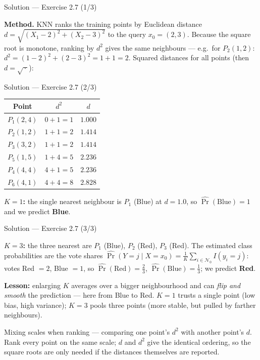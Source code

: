 \documentclass[aspectratio=169,11pt]{beamer}
\begin{document}
\begin{frame}{Solution --- Exercise 2.7 (1/3)}
\begin{solutionbox}
\textbf{Method.} KNN ranks the training points by Euclidean distance
$d=\sqrt{(X_1-2)^2+(X_2-3)^2}$ to the query $x_0=(2,3)$. Because the
square root is monotone, ranking by $d^2$ gives the same neighbours ---
e.g.\ for $P_2(1,2)$: $d^2=(1-2)^2+(2-3)^2=1+1=2$. Squared distances
for all points (then $d=\sqrt{\,\cdot\,}$):
\end{solutionbox}
\end{frame}

\begin{frame}{Solution --- Exercise 2.7 (2/3)}
\begin{solutionbox}
\begin{center}\footnotesize
\begin{tabular}{ccc}
\toprule
Point & $d^2$ & $d$ \\
\midrule
$P_1(2,4)$ & $0+1=1$ & $1.000$ \\
$P_2(1,2)$ & $1+1=2$ & $1.414$ \\
$P_3(3,2)$ & $1+1=2$ & $1.414$ \\
$P_5(1,5)$ & $1+4=5$ & $2.236$ \\
$P_4(4,4)$ & $4+1=5$ & $2.236$ \\
$P_6(4,1)$ & $4+4=8$ & $2.828$ \\
\bottomrule
\end{tabular}
\end{center}
\textbf{$K=1$:} the single nearest neighbour is $P_1$ (Blue) at
$d=1.0$, so $\hat\Pr(\text{Blue})=1$ and we predict \textbf{Blue}.
\end{solutionbox}
\end{frame}

\begin{frame}{Solution --- Exercise 2.7 (3/3)}
\begin{solutionbox}
\textbf{$K=3$:} the three nearest are $P_1$ (Blue), $P_2$ (Red),
$P_3$ (Red). The estimated class probabilities are the vote shares
$\hat\Pr(Y=j\mid X=x_0)=\frac1K\sum_{i\in\mathcal N_0}I(y_i=j)$:
votes Red $=2$, Blue $=1$, so
$\hat\Pr(\text{Red})=\tfrac23$, $\hat\Pr(\text{Blue})=\tfrac13$; we
predict \textbf{Red}.

\textbf{Lesson:} enlarging $K$ averages over a bigger neighbourhood
and can \emph{flip and smooth} the prediction --- here from Blue to
Red. $K=1$ trusts a single point (low bias, high variance); $K=3$
pools three points (more stable, but pulled by farther neighbours).
\end{solutionbox}
\begin{mistake}
Mixing scales when ranking --- comparing one
point's $d^2$ with another point's $d$. Rank every point on the same
scale; $d$ and $d^2$ give the identical ordering, so the square roots
are only needed if the distances themselves are reported.
\end{mistake}
\end{frame}
\end{document}
